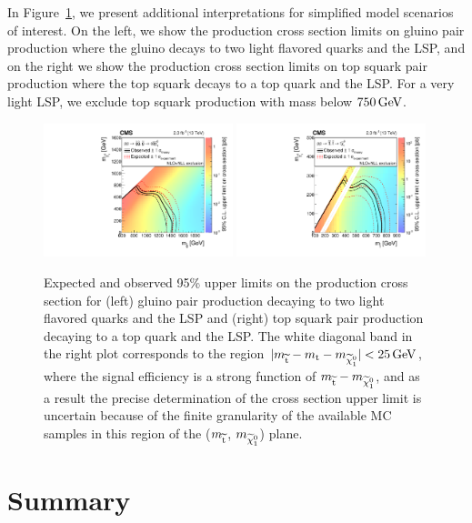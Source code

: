 In Figure~\ref{fig:limitT1qqqqT2tt}, we present additional interpretations for
simplified model scenarios of interest. On the left, we show the production cross section
limits on gluino pair production where the gluino decays to two light flavored
quarks and the LSP, and on the right we show the production cross section limits on
top squark pair production where the top squark decays to a top quark and the LSP. 
For a very light LSP, we exclude top squark production with mass below
$750 \,\text{Ge\hspace{-.08em}V}$.

\begin{figure}[!htb] \centering
\includegraphics[width=0.49\textwidth]{figs/analysis13TeV/UnblindedResults/T1qqqqFinalXSEC.pdf}
\includegraphics[width=0.49\textwidth]{figs/analysis13TeV/UnblindedResults/T2ttFinalXSEC.pdf}
\caption{ Expected and observed 95\% upper limits on the production cross section
for (left) gluino pair production decaying to two light flavored quarks and the LSP
and (right) top squark pair production decaying to a top quark and the LSP. 
The white diagonal band in the right plot corresponds to the region
$\lvert m_{\widetilde{\mathrm{t}}}-m_{\mathrm{t}}-m_{\widetilde{\chi}^{0}_1} \rvert < 25 \,\text{Ge\hspace{-.08em}V}$, where the signal 
efficiency is a strong function of $m_{\widetilde{\mathrm{t}}}-m_{\widetilde{\chi}^{0}_1}$, and as a 
result the precise determination of the cross section upper limit is uncertain
because of the finite granularity of the available MC samples 
in this region of the ($m_{\widetilde{\mathrm{t}}}$, $m_{\widetilde{\chi}^{0}_1}$)  plane.
}
\label{fig:limitT1qqqqT2tt}
\end{figure}


\section{Summary}
\label{sec:Summary}

